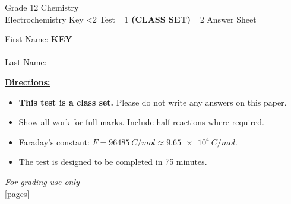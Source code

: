 \documentclass[addpoints]{exam}
\newcommand{\event}{Electrochemistry}
\newcommand{\tournament}{}  %
\def\type{0}
\begin{document}
\begin{center}
    {\huge Grade 12 Chemistry \\ \event
    \ifprintanswers
     \space Key
    \else
     \space \ifnum\type<2 Test \fi \ifnum\type=1 \textbf{(CLASS SET)} \fi \ifnum\type=2 Answer Sheet \fi
    \fi \\ \vspace{3mm}\tournament\vspace{1mm}}
\end{center}

\vspace{.25\textheight}

\begin{center}
    First Name: \ifprintanswers
    \underline{\hspace{3.5cm}}\textbf{KEY}\underline{\hspace{5.5cm}}\\\vspace{5mm}
    \else
        \underline{\hspace{10cm}}\\ \vspace{5mm}
    \fi
    Last Name: \underline{\hspace{10cm}}\\ \vspace{5mm}
\end{center}

\noindent\textbf{\underline{Directions:}}
\begin{itemize}
    \ifnum\type=1 \item \textbf{This test is a class set.} Please do not write any answers on this paper. \fi
    \item Show all work for full marks. Include half-reactions where required.
    \item Faraday's constant: $F = \SI{96485}{C/mol} \approx \SI{9.65e4}{C/mol}$.
    \item The test is designed to be completed in 75 minutes.
\end{itemize}
\begin{center}
\textit{For grading use only}\\
[pages]
\end{center}
\end{document}
